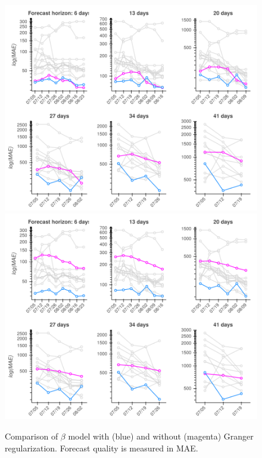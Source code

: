 \documentclass{article}
\newcommand{\bAR}{\ensuremath{\beta}\text{-AR}\xspace}
\begin{document}
\begin{figure}[t]
\centering
\includegraphics[width=.9\columnwidth]{img/us_mae_granger_ablation/us_mae_granger_ablation.png}
\hfil
\includegraphics[width=.9\columnwidth]{img/us_mae_loss_ablation/us_mae_granger_ablation.png}
\caption{\label{fig:mae-covidhub-granger}Comparison of \bAR model with (blue) and without (magenta) Granger regularization. Forecast quality is measured in MAE.}
\end{figure}
\end{document}
